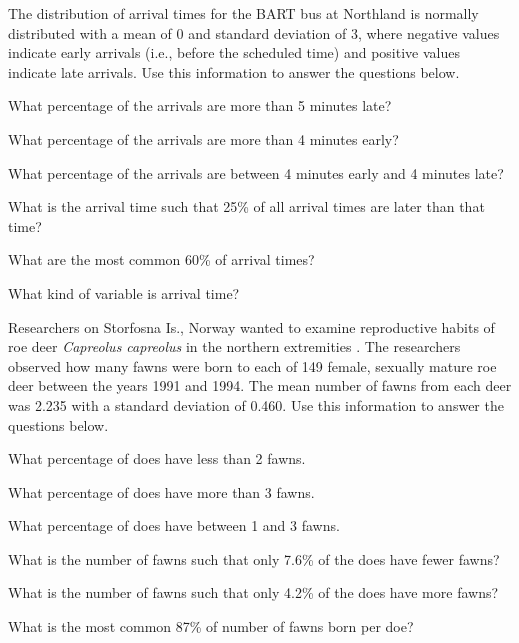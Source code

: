 \documentclass[10pt,openany]{book}\usepackage[]{graphicx}\usepackage[]{color}
\begin{document}
\begin{exsection}
  \item \label{revex:quNormBart} The distribution of arrival times for the BART bus at Northland is normally distributed with a mean of 0 and standard deviation of 3, where negative values indicate early arrivals (i.e., before the scheduled time) and positive values indicate late arrivals.  Use this information to answer the questions below.  
\begin{Enumerate}
  \item What percentage of the arrivals are more than 5 minutes late?
  \item What percentage of the arrivals are more than 4 minutes early?
  \item What percentage of the arrivals are between 4 minutes early and 4 minutes late?
  \item What is the arrival time such that 25\% of all arrival times are later than that time?
  \item What are the most common 60\% of arrival times?
  \item What kind of variable is arrival time?
\end{Enumerate}

  \item \label{revex:quNormRoeDeer} Researchers on Storfosna Is., Norway wanted to examine reproductive habits of roe deer \textit{Capreolus capreolus} in the northern extremities \citep{AndersenLinnell2000}.  The researchers observed how many fawns were born to each of 149 female, sexually mature roe deer between the years 1991 and 1994.  The mean number of fawns from each deer was 2.235 with a standard deviation of 0.460.  Use this information to answer the questions below. 
\begin{Enumerate}
  \item What percentage of does have less than 2 fawns.
  \item What percentage of does have more than 3 fawns.
  \item What percentage of does have between 1 and 3 fawns.
  \item What is the number of fawns such that only 7.6\% of the does have fewer fawns?
  \item What is the number of fawns such that only 4.2\% of the does have more fawns?
  \item What is the most common 87\% of number of fawns born per doe?
\end{Enumerate}


\end{exsection}
\end{document}
